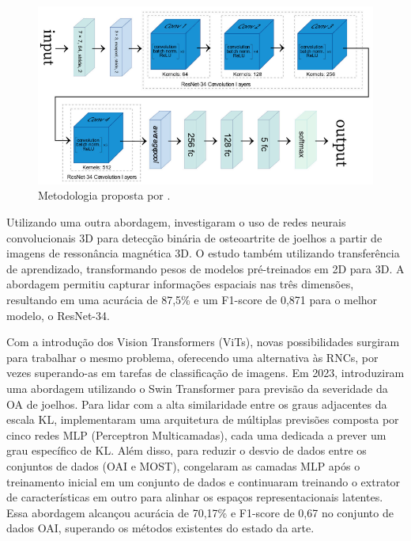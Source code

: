 \begin{figure}[ht]
    \centering
    \includegraphics[width=\textwidth]{figs/cueva2022.png}
    \caption{Metodologia proposta por \cite{Cueva2022}.}
    \label{fig:cueva2022}
\end{figure}

Utilizando uma outra abordagem, \cite{yeoh2023} investigaram o uso de redes neurais convolucionais 3D para detecção binária de osteoartrite de joelhos a partir de imagens de ressonância magnética 3D. O estudo também utilizando transferência de aprendizado, transformando pesos de modelos pré-treinados em 2D para 3D. A abordagem permitiu capturar informações espaciais nas três dimensões, resultando em uma acurácia de 87,5\% e um F1-score de 0,871 para o melhor modelo, o ResNet-34.

Com a introdução dos Vision Transformers (ViTs), novas possibilidades surgiram para trabalhar o mesmo problema, oferecendo uma alternativa às RNCs, por vezes superando-as em tarefas de classificação de imagens. Em 2023, \cite{sekhri2023} introduziram uma abordagem utilizando o Swin Transformer para previsão da severidade da OA de joelhos. Para lidar com a alta similaridade entre os graus adjacentes da escala KL, implementaram uma arquitetura de múltiplas previsões composta por cinco redes MLP (Perceptron Multicamadas), cada uma dedicada a prever um grau específico de KL. Além disso, para reduzir o desvio de dados entre os conjuntos de dados (OAI e MOST), congelaram as camadas MLP após o treinamento inicial em um conjunto de dados e continuaram treinando o extrator de características em outro para alinhar os espaços representacionais latentes. Essa abordagem alcançou acurácia de 70,17\% e F1-score de 0,67 no conjunto de dados OAI, superando os métodos existentes do estado da arte.

